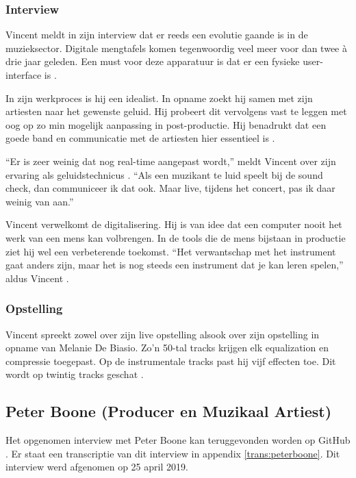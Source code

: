 \subsubsection*{Interview}

Vincent meldt in zijn interview dat er reeds een evolutie gaande is in de muzieksector. Digitale mengtafels komen tegenwoordig veel meer voor dan twee à drie jaar geleden. Een must voor deze apparatuur is dat er een fysieke user-interface is \autocite{bartvincent}.

In zijn werkproces is hij een idealist. In opname zoekt hij samen met zijn artiesten naar het gewenste geluid. Hij probeert dit vervolgens vast te leggen met oog op zo min mogelijk aanpassing in post-productie. Hij benadrukt dat een goede band en communicatie met de artiesten hier essentieel is \autocite{bartvincent}.

``Er is zeer weinig dat nog real-time aangepast wordt,'' meldt Vincent over zijn ervaring als geluidstechnicus \autocite{bartvincent}. ``Als een muzikant te luid speelt bij de sound check, dan communiceer ik dat ook. Maar live, tijdens het concert, pas ik daar weinig van aan.''

Vincent verwelkomt de digitalisering. Hij is van idee dat een computer nooit het werk van een mens kan volbrengen. In de tools die de mens bijstaan in productie ziet hij wel een verbeterende toekomst. ``Het verwantschap met het instrument gaat anders zijn, maar het is nog steeds een instrument dat je kan leren spelen,'' aldus Vincent \autocite{bartvincent}.

\subsubsection*{Opstelling}

Vincent spreekt zowel over zijn live opstelling alsook over zijn opstelling in opname van Melanie De Biasio. Zo'n 50-tal tracks krijgen elk equalization en compressie toegepast. Op de instrumentale tracks past hij vijf effecten toe. Dit wordt op twintig tracks geschat \autocite{bartvincent}.

\subsection{Peter Boone (Producer en Muzikaal Artiest)}
\label{sub:boone}

Het opgenomen interview met Peter Boone kan teruggevonden worden op GitHub \autocite{peterboone}. Er staat een transcriptie van dit interview in appendix \ref{trans:peterboone}. Dit interview werd afgenomen op 25 april 2019.

